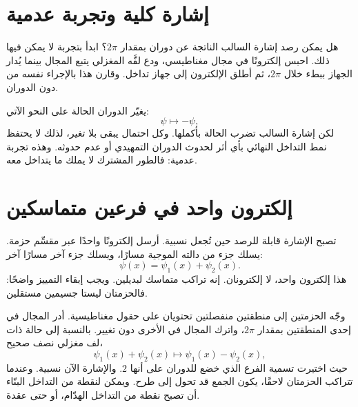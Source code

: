 \begin{classroomqa}
\end{classroomqa}

\section{إشارة كلية وتجربة عدمية}

هل يمكن رصد إشارة السالب الناتجة عن دوران بمقدار \(2\pi\)؟ ابدأ بتجربة لا يمكن فيها ذلك. احبس إلكترونًا في مجال مغناطيسي، ودع لفَّه المغزلي يتبع المجال بينما يُدار الجهاز ببطء خلال \(2\pi\)، ثم أطلق الإلكترون إلى جهاز تداخل. وقارن هذا بالإجراء نفسه من دون الدوران.

يغيّر الدوران الحالة على النحو الآتي:
\begin{equation}
\psi\longmapsto-\psi,
\end{equation}
لكن إشارة السالب تضرب الحالة بأكملها. وكل احتمال يبقى بلا تغير، لذلك لا يحتفظ نمط التداخل النهائي بأي أثر لحدوث الدوران التمهيدي أو عدم حدوثه. وهذه تجربة عدمية: فالطور المشترك لا يملك ما يتداخل معه.

\begin{classroomqa}
\end{classroomqa}

\section{إلكترون واحد في فرعين متماسكين}

تصبح الإشارة قابلة للرصد حين تُجعل نسبية. أرسل إلكترونًا واحدًا عبر مقسِّم حزمة. يسلك جزء من دالته الموجية مسارًا، ويسلك جزء آخر مسارًا آخر:
\begin{equation}
\psi(x)=\psi_1(x)+\psi_2(x).
\end{equation}
هذا إلكترون واحد، لا إلكترونان. إنه تراكب متماسك لبديلين. ويجب إبقاء التمييز واضحًا: فالحزمتان ليستا جسيمين مستقلين.

وجّه الحزمتين إلى منطقتين منفصلتين تحتويان على حقول مغناطيسية. أدر المجال في إحدى المنطقتين بمقدار \(2\pi\)، واترك المجال في الأخرى دون تغيير. بالنسبة إلى حالة ذات لف مغزلي نصف صحيح،
\begin{equation}
\psi_1(x)+\psi_2(x)
\longmapsto
\psi_1(x)-\psi_2(x),
\end{equation}
حيث اختيرت تسمية الفرع الذي خضع للدوران على أنها \(2\). والإشارة الآن نسبية. وعندما تتراكب الحزمتان لاحقًا، يكون الجمع قد تحول إلى طرح. ويمكن لنقطة من التداخل البنّاء أن تصبح نقطة من التداخل الهدّام، أو حتى عقدة.

